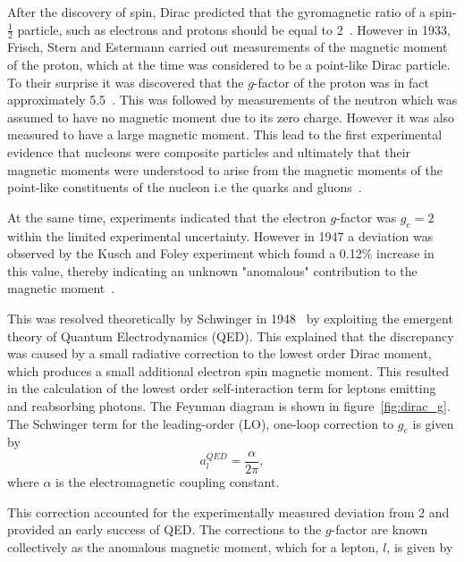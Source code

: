 After the discovery of spin, Dirac predicted that the gyromagnetic ratio of a spin-$\frac{1}{2}$ particle, such as electrons and protons should be equal to 2~\cite{Reference2}. However in 1933, Frisch, Stern and Estermann carried out measurements of the magnetic moment of the proton, which at the time was considered to be a point-like Dirac particle. To their surprise it was discovered that the $g$-factor of the proton was in fact approximately 5.5~\cite{Reference3}\cite{Reference4}.
This was followed by measurements of the neutron which was assumed to have no magnetic moment due to its zero charge. However it was also measured to have a large magnetic moment. This lead to the first experimental evidence that nucleons were composite particles and ultimately that their magnetic moments were understood to arise from the magnetic moments of the point-like constituents of the nucleon i.e the quarks and gluons~\cite{Reference5}.

At the same time, experiments indicated that the electron $g$-factor was $g_{e} = 2$ within the limited experimental uncertainty. However in 1947 a deviation was observed by the Kusch and Foley experiment which found a 0.12$\%$ increase in this value, thereby indicating an unknown "anomalous" contribution to the magnetic moment~\cite{Reference6}.

This was resolved theoretically by Schwinger in 1948~\cite{Reference7,QED} by exploiting the emergent theory of  Quantum Electrodynamics (QED). This explained that the discrepancy was caused by a small radiative correction to the lowest order Dirac moment, which produces a small additional electron spin magnetic moment. This resulted in the calculation of the lowest order self-interaction term for leptons emitting and reabsorbing photons. The Feynman diagram is shown in figure~\ref{fig:dirac_g}. The Schwinger term for the leading-order (LO), one-loop correction to $g_{e}$ is given by
\begin{equation}
 a_{l}^{QED} = {\frac{\alpha }{2\pi}},
\end{equation}
where $\alpha$ is the electromagnetic coupling constant.

This correction accounted for the experimentally measured deviation from 2 and provided an early success of QED. The corrections to the $g$-factor are known collectively as the anomalous magnetic moment, which for a lepton, $l$, is given by

